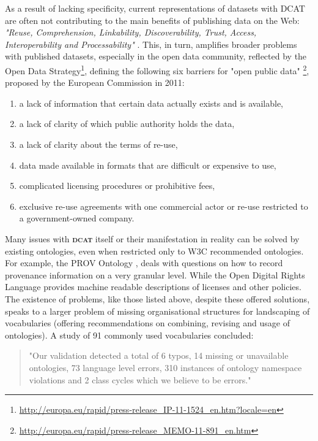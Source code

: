 \documentclass[a4paper,english,twoside,BCOR1.5cm,headsepline,DIV12,appendixprefix,final,12pt]{scrbook}
\newcommand{\dcat}{{\scshape\bfseries dcat}\xspace}
\newcommand\footnoteurl[1]{\footnote{\scriptsize\url{#1}}}
\begin{document}
As a result of lacking specificity, current representations of datasets with DCAT are often not contributing to the main benefits of publishing data on the Web: \textit{"Reuse, Comprehension, Linkability, Discoverability, Trust, Access, Interoperability and Processability"} \cite{dwbpW3C2016}. This, in turn, amplifies broader problems with published datasets, especially in the open data community, reflected by the Open Data Strategy\footnoteurl{http://europa.eu/rapid/press-release_IP-11-1524_en.htm?locale=en}, defining the following six barriers for "open public data" \footnoteurl{http://europa.eu/rapid/press-release_MEMO-11-891_en.htm}, proposed by the European Commission in 2011:

\begin{enumerate}
\item a lack of information that certain data actually exists and is available,
\item a lack of clarity of which public authority holds the data,
\item a lack of clarity about the terms of re-use,
\item data made available in formats that are difficult or expensive to use,
\item complicated licensing procedures or prohibitive fees,
\item exclusive re-use agreements with one commercial actor or re-use restricted to a government-owned company.
\end{enumerate}

Many issues with \dcat itself or their manifestation in reality can be solved by existing ontologies, even when restricted only to W3C recommended ontologies. For example, the PROV Ontology \cite{prov}, deals with questions on how to record provenance information on a very granular level. While the Open Digital Rights Language \cite{odrl} provides machine readable descriptions of licenses and other policies. The existence of problems, like those listed above, despite these offered solutions, speaks to a larger problem of missing organisational structures for landscaping of vocabularies (offering recommendations on combining, revising and usage of ontologies). A study of 91 commonly used vocabularies concluded:

\begin{quote}
"Our validation detected a total of 6 typos, 14
missing or unavailable ontologies, 73 language level
errors, 310 instances of ontology namespace violations
and 2 class cycles which we believe to be errors." \cite{feeney2015linked}
\end{quote}
\end{document}

